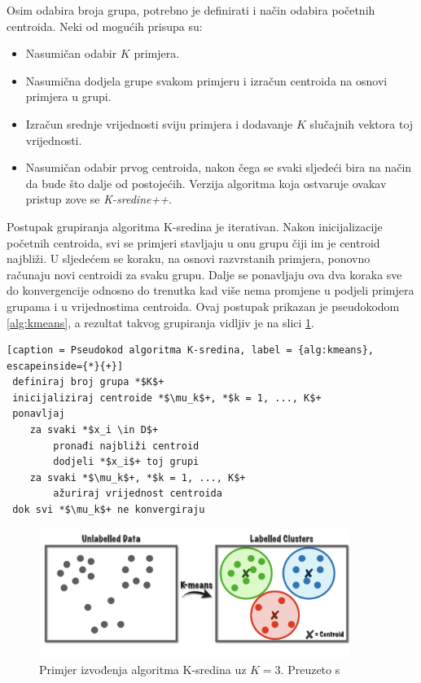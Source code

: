 \documentclass[utf8, diplomski, numeric]{fer}
\begin{document}
Osim odabira broja grupa, potrebno je definirati i način odabira početnih centroida. Neki od mogućih prisupa su:
\begin{itemize}
\item Nasumičan odabir $K$ primjera.
\item Nasumična dodjela grupe svakom primjeru i izračun centroida na osnovi primjera u grupi.
\item Izračun srednje vrijednosti sviju primjera i dodavanje $K$ slučajnih vektora toj vrijednosti.
\item Nasumičan odabir prvog centroida, nakon čega se svaki sljedeći bira na način da bude što dalje od postojećih. Verzija algoritma koja ostvaruje ovakav pristup zove se \textit{K-sredine++}.
\end{itemize}

Postupak grupiranja algoritma K-sredina je iterativan. Nakon inicijalizacije početnih centroida, svi se primjeri stavljaju u onu grupu čiji im je centroid najbliži. U sljedećem se koraku, na osnovi razvrstanih primjera, ponovno računaju novi centroidi za svaku grupu. Dalje se ponavljaju ova dva koraka sve do konvergencije odnosno do trenutka kad više nema promjene u podjeli primjera grupama i u vrijednostima centroida. Ovaj postupak prikazan je pseudokodom \ref{alg:kmeans}, a rezultat takvog grupiranja vidljiv je na slici \ref{fig:kmeans}.

 \begin{lstlisting}[caption = Pseudokod algoritma K-sredina, label = {alg:kmeans}, escapeinside={*}{+}]
 definiraj broj grupa *$K$+
 inicijaliziraj centroide *$\mu_k$+, *$k = 1, ..., K$+
 ponavljaj
 	za svaki *$x_i \in D$+
 		pronađi najbliži centroid
 		dodjeli *$x_i$+ toj grupi
	za svaki *$\mu_k$+, *$k = 1, ..., K$+
		ažuriraj vrijednost centroida
 dok svi *$\mu_k$+ ne konvergiraju
\end{lstlisting}

\begin{figure}
\includegraphics[width=0.9\textwidth]{images/kmeans.png}
\centering
\caption{Primjer izvođenja algoritma K-sredina uz $K = 3$. Preuzeto s  \cite{kMeansUsingPython}}
\label{fig:kmeans}
\end{figure}
\end{document}
